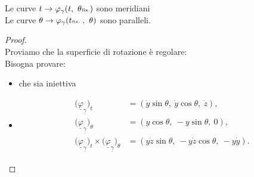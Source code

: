 \documentclass[a4paper, oneside]{article}
\begin{document}
\begin{definition}
  Le curve $t \to \varphi_\gamma (t , \ \theta \text{\tiny{fix.}})$ sono meridiani\\
  Le curve $\theta \to \varphi_\gamma (t \text{\tiny{fix.} }, \  \theta)$ sono paralleli.
\end{definition}
\begin{proof}
\hfill\\
Proviamo che la superficie di rotazione è regolare:\\
Bisogna provare:
\begin{itemize}
  \item che sia iniettiva
  \item
  \[
  \begin{aligned}
    \bigl(\underline{\varphi}_{\underline{\gamma}}\bigr)_t
      &= (\dot y\sin\theta,\ \dot y\cos\theta,\ \dot z),\\
    \bigl(\underline{\varphi}_{\underline{\gamma}}\bigr)_\theta
      &= (y\cos\theta,\ -y\sin\theta,\ 0),\\
    \bigl(\underline{\varphi}_{\underline{\gamma}}\bigr)_t\times\bigl(\underline{\varphi}_{\underline{\gamma}}\bigr)_\theta
      &= (y\dot z\sin\theta,\ -y\dot z\cos\theta,\ -y\dot y).
  \end{aligned}
  \]
\end{itemize}
\end{proof}

\newpage
\end{document}
